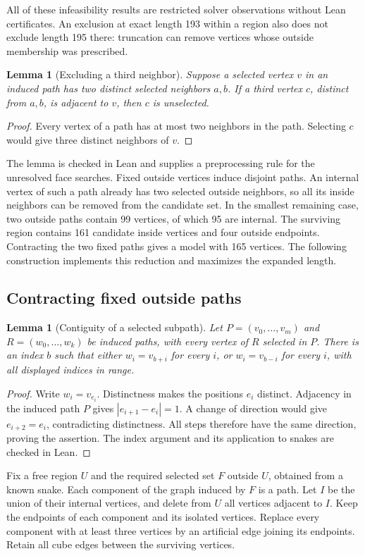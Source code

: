 \documentclass[11pt,a4paper]{article}
\newtheorem{lemma}[theorem]{Lemma}
\theoremstyle{definition}
\theoremstyle{remark}
\begin{document}
All of these infeasibility results are restricted solver observations without Lean certificates. An exclusion at exact length 193 within a region also does not exclude length 195 there: truncation can remove vertices whose outside membership was prescribed.

\begin{lemma}[Excluding a third neighbor]
Suppose a selected vertex $v$ in an induced path has two distinct selected neighbors $a,b$. If a third vertex $c$, distinct from $a,b$, is adjacent to $v$, then $c$ is unselected.
\end{lemma}
\begin{proof}
Every vertex of a path has at most two neighbors in the path. Selecting $c$ would give three distinct neighbors of $v$.
\end{proof}
The lemma is checked in Lean and supplies a preprocessing rule for the unresolved face searches. Fixed outside vertices induce disjoint paths. An internal vertex of such a path already has two selected outside neighbors, so all its inside neighbors can be removed from the candidate set. In the smallest remaining case, two outside paths contain 99 vertices, of which 95 are internal. The surviving region contains 161 candidate inside vertices and four outside endpoints. Contracting the two fixed paths gives a model with 165 vertices. The following construction implements this reduction and maximizes the expanded length.

\subsection{Contracting fixed outside paths}
\begin{lemma}[Contiguity of a selected subpath]
Let $P=(v_0,\ldots,v_m)$ and $R=(w_0,\ldots,w_k)$ be induced paths, with every vertex of $R$ selected in $P$. There is an index $b$ such that either $w_i=v_{b+i}$ for every $i$, or $w_i=v_{b-i}$ for every $i$, with all displayed indices in range.
\end{lemma}
\begin{proof}
Write $w_i=v_{e_i}$. Distinctness makes the positions $e_i$ distinct. Adjacency in the induced path $P$ gives $|e_{i+1}-e_i|=1$. A change of direction would give $e_{i+2}=e_i$, contradicting distinctness. All steps therefore have the same direction, proving the assertion. The index argument and its application to snakes are checked in Lean.
\end{proof}

Fix a free region $U$ and the required selected set $F$ outside $U$, obtained from a known snake. Each component of the graph induced by $F$ is a path. Let $I$ be the union of their internal vertices, and delete from $U$ all vertices adjacent to $I$. Keep the endpoints of each component and its isolated vertices. Replace every component with at least three vertices by an artificial edge joining its endpoints. Retain all cube edges between the surviving vertices.
\end{document}
